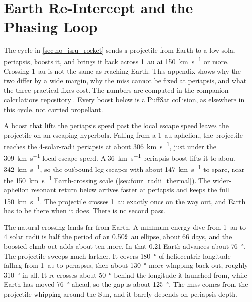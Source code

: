 \documentclass{article}
\begin{document}
\section{Earth Re-Intercept and the Phasing Loop}\label{sec:earth_reintercept}
The cycle in \autoref{sec:no_isru_rocket} sends a projectile from Earth to a low solar periapsis, boosts it, and brings it back across \SI{1}{\astronomicalunit} at \SI{150}{\kilo\meter\per\second} or more. Crossing \SI{1}{\astronomicalunit} is not the same as reaching Earth. This appendix shows why the two differ by a wide margin, why the miss cannot be fixed at periapsis, and what the three practical fixes cost. The numbers are computed in the companion calculations repository \cite{Katz_aim_is_all_you_need_2025}. Every boost below is a PuffSat collision, as elsewhere in this cycle, not carried propellant.

A boost that lifts the periapsis speed past the local escape speed leaves the projectile on an escaping hyperbola. Falling from a \SI{1}{\astronomicalunit} aphelion, the projectile reaches the 4-solar-radii periapsis at about \SI{306}{\kilo\meter\per\second}, just under the \SI{309}{\kilo\meter\per\second} local escape speed. A \SI{36}{\kilo\meter\per\second} periapsis boost lifts it to about \SI{342}{\kilo\meter\per\second}, so the outbound leg escapes with about \SI{147}{\kilo\meter\per\second} to spare, near the \SI{150}{\kilo\meter\per\second} Earth-crossing scale (\autoref{sec:four_radii_thermal}). The wider-aphelion resonant return below arrives faster at periapsis and keeps the full \SI{150}{\kilo\meter\per\second}. The projectile crosses \SI{1}{\astronomicalunit} exactly once on the way out, and Earth has to be there when it does. There is no second pass.

The natural crossing lands far from Earth. A minimum-energy dive from \SI{1}{\astronomicalunit} to 4 solar radii is half the period of an \SI{0.509}{\astronomicalunit} ellipse, about 66 days, and the boosted climb-out adds about ten more. In that \SI{0.21}{\year} Earth advances about \SI{76}{\degree}. The projectile sweeps much farther. It covers \SI{180}{\degree} of heliocentric longitude falling from \SI{1}{\astronomicalunit} to periapsis, then about \SI{130}{\degree} more whipping back out, roughly \SI{310}{\degree} in all. It re-crosses about \SI{50}{\degree} behind the longitude it launched from, while Earth has moved \SI{76}{\degree} ahead, so the gap is about \SI{125}{\degree}. The miss comes from the projectile whipping around the Sun, and it barely depends on periapsis depth.
\end{document}

